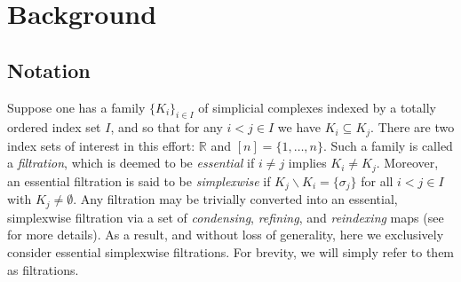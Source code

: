\documentclass{siamart190516}
\begin{document}
\section{Background}\label{sec:background} 
\subsection{Notation}\label{sec:notation} 

Suppose one has a family $\{K_i\}_{i\in I}$ of simplicial complexes indexed by a totally ordered index set $I$, and so that for any $i< j \in I$ we have $K_i \subseteq K_j$. There are two index sets of interest in this effort: $\mathbb{R}$ and $[n] = \{ 1, \dots, n\}$. 
Such a family is called a \emph{filtration},
which is deemed to be \emph{essential} if $i \neq j$ implies $K_i \neq K_j$.
Moreover, an essential filtration is said to be  \emph{simplexwise} if $K_j \smallsetminus K_i = \{\sigma_j\}$ for all $i< j \in I$ with $K_j \neq \emptyset$.
Any filtration may be trivially converted into an essential, simplexwise filtration via a set of \emph{condensing}, \emph{refining}, and \emph{reindexing} maps (see~\cite{bauer2021ripser} for more details). 
As a result, and without loss of generality, here we exclusively consider essential simplexwise filtrations. For brevity, we will simply refer to them as filtrations. 
\end{document}
